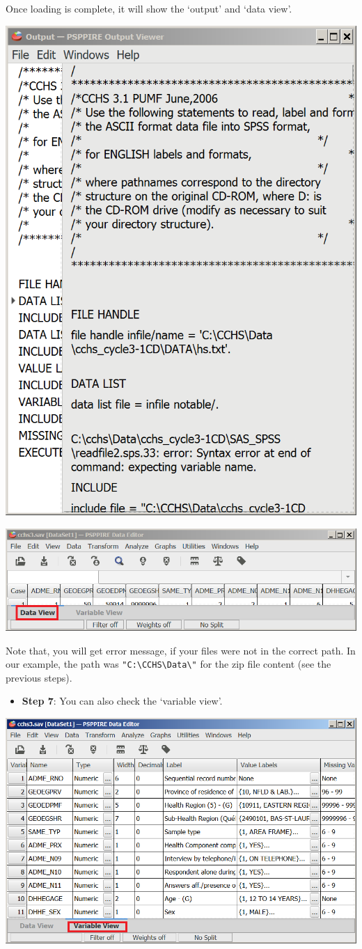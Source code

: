 \documentclass[
]{book}
\providecommand{\tightlist}{%
  \setlength{\itemsep}{0pt}\setlength{\parskip}{0pt}}
\begin{document}
Once loading is complete, it will show the `output' and `data view'.

\includegraphics[width=0.65\linewidth]{images/abacusNew}

\includegraphics[width=0.65\linewidth]{images/abacus36}

Note that, you will get error message, if your files were not in the correct path. In our example, the path was \texttt{"C:\textbackslash{}CCHS\textbackslash{}Data\textbackslash{}"} for the zip file content (see the previous steps).

\begin{itemize}
\tightlist
\item
  \textbf{Step 7}: You can also check the `variable view'.
\end{itemize}

\includegraphics[width=0.65\linewidth]{images/abacus37}
\end{document}

